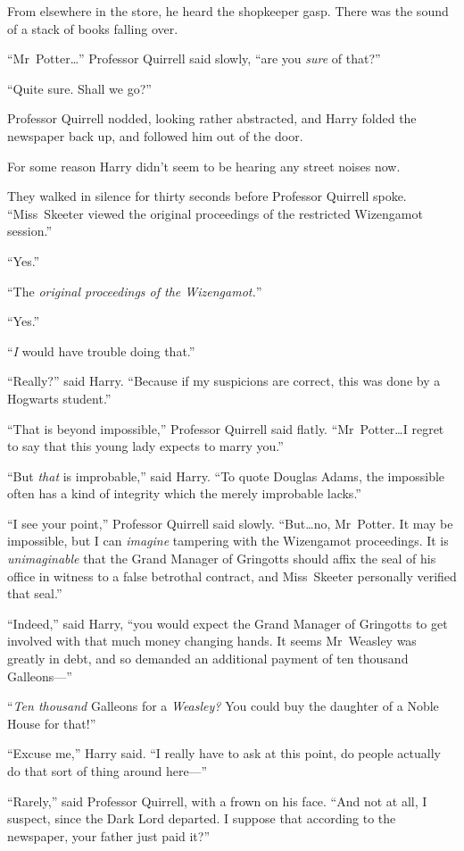 From elsewhere in the store, he heard the shopkeeper gasp. There was the sound of a stack of books falling over.

“Mr~Potter…” Professor Quirrell said slowly, “are you \emph{sure} of that?”

“Quite sure. Shall we go?”

Professor Quirrell nodded, looking rather abstracted, and Harry folded the newspaper back up, and followed him out of the door.

For some reason Harry didn’t seem to be hearing any street noises now.

They walked in silence for thirty seconds before Professor Quirrell spoke. “Miss~Skeeter viewed the original proceedings of the restricted Wizengamot session.”

“Yes.”

“The \emph{original proceedings of the Wizengamot.}”

“Yes.”

“\emph{I} would have trouble doing that.”

“Really?” said Harry. “Because if my suspicions are correct, this was done by a Hogwarts student.”

“That is beyond impossible,” Professor Quirrell said flatly.
“Mr~Potter…I regret to say that this young lady expects to marry you.”

“But \emph{that} is improbable,” said Harry. “To quote Douglas Adams, the impossible often has a kind of integrity which the merely improbable lacks.”

“I see your point,” Professor Quirrell said slowly. “But…no, Mr~Potter. It may be impossible, but I can \emph{imagine} tampering with the Wizengamot proceedings. It is \emph{unimaginable} that the Grand Manager of Gringotts should affix the seal of his office in witness to a false betrothal contract, and Miss~Skeeter personally verified that seal.”

“Indeed,” said Harry, “you would expect the Grand Manager of Gringotts to get involved with that much money changing hands. It seems Mr~Weasley was greatly in debt, and so demanded an additional payment of ten thousand Galleons—”

“\emph{Ten thousand} Galleons for a \emph{Weasley?} You could buy the daughter of a Noble House for that!”

“Excuse me,” Harry said. “I really have to ask at this point, do people actually do that sort of thing around here—”

“Rarely,” said Professor Quirrell, with a frown on his face. “And not at all, I suspect, since the Dark Lord departed. I suppose that according to the newspaper, your father just paid it?”

